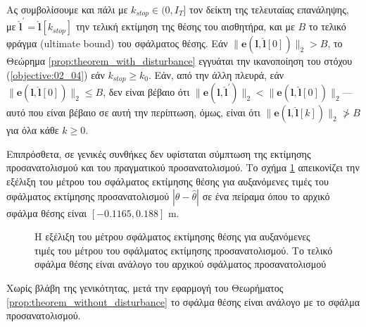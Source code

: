 Ας συμβολίσουμε και πάλι με $k_{stop} \in (0, I_T]$ τον δείκτη της τελευταίας
επανάληψης, με $\hat{\bm{l}}^{\prime} = \hat{\bm{l}}[k_{stop}]$ την τελική
εκτίμηση της θέσης του αισθητήρα, και με $B$ το τελικό φράγμα (ultimate bound)
του σφάλματος θέσης. Εάν $\|\bm{e}(\bm{l}, \hat{\bm{l}}[0])\|_2 > B$, το
Θεώρημα \ref{prop:theorem_with_disturbance} εγγυάται την ικανοποίηση του στόχου
(\ref{objective:02_04}) εάν $k_{stop} \geq k_0$. Εάν, από την άλλη πλευρά, εάν
$\|\bm{e}(\bm{l}, \hat{\bm{l}}[0])\|_2 \leq B$, δεν είναι βέβαιο ότι
$\|\bm{e}(\bm{l}, \hat{\bm{l}}^{\prime})\|_2 < \|\bm{e}(\bm{l},
\hat{\bm{l}}[0])\|_2$---αυτό που είναι βέβαιο σε αυτή την περίπτωση, όμως,
είναι ότι $\|\bm{e}(\bm{l}, \hat{\bm{l}}[k])\|_2 \ngtr B$ για όλα κάθε $k \geq
0$.

Επιπρόσθετα, σε γενικές συνθήκες δεν υφίσταται σύμπτωση της εκτίμησης
προσανατολισμού και του πραγματικού προσανατολισμού.  Το σχήμα
\ref{fig:02_04_03:tc_x1_non_convergence} απεικονίζει την εξέλιξη του μέτρου του
σφάλματος εκτίμησης θέσης για αυξανόμενες τιμές του σφάλματος εκτίμησης
προσανατολισμού $|\theta - \hat{\theta}|$ σε ένα πείραμα όπου το αρχικό σφάλμα
θέσης είναι $[-0.1165, 0.188]$ m.

\begin{figure}[!h]\centering
  
  \caption{\small Η εξέλιξη του μέτρου σφάλματος εκτίμησης θέσης για αυξανόμενες
           τιμές του μέτρου του σφάλματος εκτίμησης προσανατολισμού. Το τελικό
           σφάλμα θέσης είναι ανάλογο του αρχικού σφάλματος προσανατολισμού}
  \label{fig:02_04_03:tc_x1_non_convergence}
\end{figure}

\begin{gg_box}
\begin{remark}
  \label{remark:loc_prop_or}
  Χωρίς βλάβη της γενικότητας, μετά την εφαρμογή του Θεωρήματος
  \ref{prop:theorem_without_disturbance} το σφάλμα θέσης είναι ανάλογο με το
  σφάλμα προσανατολισμού.
\end{remark}
\end{gg_box}
